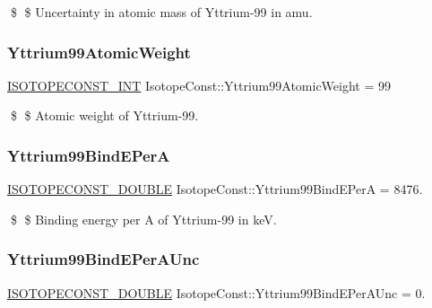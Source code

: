 \$ \$ Uncertainty in atomic mass of Yttrium-\/99 in amu. \mbox{\label{group___isotope_const-_yttrium-_y99_ga3501f6f920fd99f72bdd371024e01d3d}} 
\subsubsection{\texorpdfstring{Yttrium99\+Atomic\+Weight}{Yttrium99AtomicWeight}}
{\footnotesize\ttfamily \mbox{\hyperlink{group___isotope_const-_macros_ga5f18360b3e99483a35c32d789e62621c}{I\+S\+O\+T\+O\+P\+E\+C\+O\+N\+S\+T\+\_\+\+I\+NT}} Isotope\+Const\+::\+Yttrium99\+Atomic\+Weight = 99}

\$ \$ Atomic weight of Yttrium-\/99. \mbox{\label{group___isotope_const-_yttrium-_y99_gad63e3b180cff8841844f3b33e217dda1}} 
\subsubsection{\texorpdfstring{Yttrium99\+Bind\+E\+PerA}{Yttrium99BindEPerA}}
{\footnotesize\ttfamily \mbox{\hyperlink{group___isotope_const-_macros_ga8f45a7272ce02c0b4c65c44636ed719a}{I\+S\+O\+T\+O\+P\+E\+C\+O\+N\+S\+T\+\_\+\+D\+O\+U\+B\+LE}} Isotope\+Const\+::\+Yttrium99\+Bind\+E\+PerA = 8476.}

\$ \$ Binding energy per A of Yttrium-\/99 in keV. \mbox{\label{group___isotope_const-_yttrium-_y99_ga0aa6ff821864a3eae61a769db55548e3}} 
\subsubsection{\texorpdfstring{Yttrium99\+Bind\+E\+Per\+A\+Unc}{Yttrium99BindEPerAUnc}}
{\footnotesize\ttfamily \mbox{\hyperlink{group___isotope_const-_macros_ga8f45a7272ce02c0b4c65c44636ed719a}{I\+S\+O\+T\+O\+P\+E\+C\+O\+N\+S\+T\+\_\+\+D\+O\+U\+B\+LE}} Isotope\+Const\+::\+Yttrium99\+Bind\+E\+Per\+A\+Unc = 0.}

